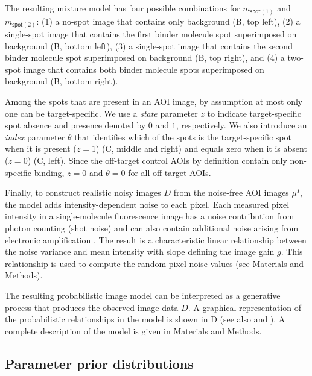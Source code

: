 The resulting mixture model has four possible combinations for $m_{\mathsf{spot}(1)}$ and $m_{\mathsf{spot}(2)}$: (1) a no-spot image that contains only background (B, top left), (2) a single-spot image that contains the first binder molecule spot superimposed on background (B, bottom left), (3) a single-spot image that contains the second binder molecule spot superimposed on background (B, top right), and (4) a two-spot image that contains both binder molecule spots superimposed on background (B, bottom right).

Among the spots that are present in an AOI image, by assumption at most only one can be target-specific. We use a \emph{state} parameter $z$ to indicate target-specific spot absence and presence denoted by $0$ and $1$, respectively. We also introduce an \emph{index} parameter $\theta$ that identifies which of the spots is the target-specific spot  when it is present ($z = 1$) (C, middle and right) and equals zero when it is absent ($z = 0$) (C, left). Since the off-target control AOIs by definition contain only non-specific binding, $z = 0$ and $\theta = 0$ for all off-target AOIs. 

Finally, to construct realistic noisy images $D$ from the noise-free AOI images $\mu^I$, the model adds intensity-dependent noise to each pixel.  Each measured pixel intensity in a single-molecule fluorescence image has a noise contribution from photon counting (shot noise) and can also contain additional noise arising from electronic amplification \citep{Van_Vliet1998-jk}. The result is a characteristic linear relationship between the noise variance and mean intensity with slope defining the image gain $g$. This relationship is used to compute the random pixel noise values (see Materials and Methods).

The resulting probabilistic image model can be interpreted as a generative process that produces the observed image data $D$. A graphical representation of the probabilistic relationships in the model is shown in D (see also  and ). A complete description of the model is given in Materials and Methods.  



\subsection{Parameter prior distributions}

